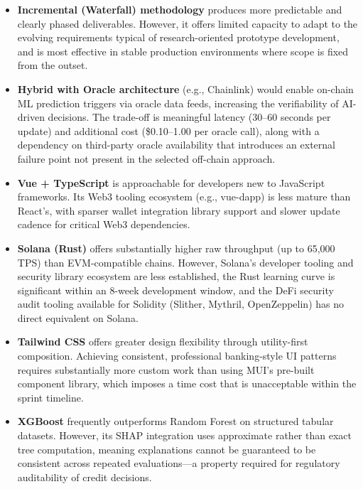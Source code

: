 \documentclass[12pt,a4paper]{report}
\begin{document}
\begin{itemize}[noitemsep]
\item \textbf{Incremental (Waterfall) methodology} produces more predictable and clearly phased deliverables. However, it offers limited capacity to adapt to the evolving requirements typical of research-oriented prototype development, and is most effective in stable production environments where scope is fixed from the outset.

\item \textbf{Hybrid with Oracle architecture} (e.g., Chainlink) would enable on-chain ML prediction triggers via oracle data feeds, increasing the verifiability of AI-driven decisions. The trade-off is meaningful latency (30--60 seconds per update) and additional cost (\$0.10--1.00 per oracle call), along with a dependency on third-party oracle availability that introduces an external failure point not present in the selected off-chain approach.

\item \textbf{Vue + TypeScript} is approachable for developers new to JavaScript frameworks. Its Web3 tooling ecosystem (e.g., vue-dapp) is less mature than React's, with sparser wallet integration library support and slower update cadence for critical Web3 dependencies.

\item \textbf{Solana (Rust)} offers substantially higher raw throughput (up to 65,000 TPS) than EVM-compatible chains. However, Solana's developer tooling and security library ecosystem are less established, the Rust learning curve is significant within an 8-week development window, and the DeFi security audit tooling available for Solidity (Slither, Mythril, OpenZeppelin) has no direct equivalent on Solana.

\item \textbf{Tailwind CSS} offers greater design flexibility through utility-first composition. Achieving consistent, professional banking-style UI patterns requires substantially more custom work than using MUI's pre-built component library, which imposes a time cost that is unacceptable within the sprint timeline.

\item \textbf{XGBoost} frequently outperforms Random Forest on structured tabular datasets. However, its SHAP integration uses approximate rather than exact tree computation, meaning explanations cannot be guaranteed to be consistent across repeated evaluations---a property required for regulatory auditability of credit decisions.


\end{itemize}
\end{document}

